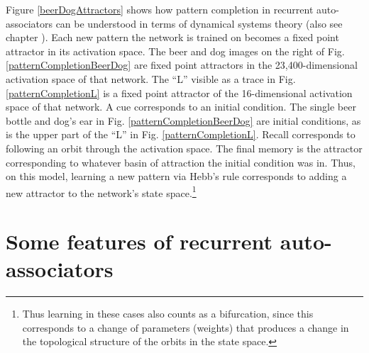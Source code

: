 Figure \ref{beerDogAttractors} shows how pattern completion in recurrent auto-associators can be understood in terms of   dynamical systems theory (also see chapter ). Each new pattern the network is trained on becomes a fixed point attractor in its activation space. The beer and dog images on the right of Fig. \ref{patternCompletionBeerDog} are fixed point attractors in the 23,400-dimensional activation space of that network. The ``L'' visible as a trace in Fig. \ref{patternCompletionL} is a fixed point attractor of the 16-dimensional activation space of that network. A cue corresponds to an initial condition. The single beer bottle and dog's ear in Fig. \ref{patternCompletionBeerDog} are initial conditions, as is the upper part of the ``L'' in Fig. \ref{patternCompletionL}. Recall corresponds to following an orbit through the activation space. The final memory is the attractor corresponding to whatever basin of attraction the initial condition was in. Thus, on this model, learning a new pattern via Hebb's rule corresponds to adding a new attractor to the network's state space.\footnote{Thus learning in these cases also counts as a bifurcation, since this corresponds to a change of parameters (weights) that produces a change in the topological structure of the orbits in the state space.}


\section{Some features of recurrent auto-associators}

